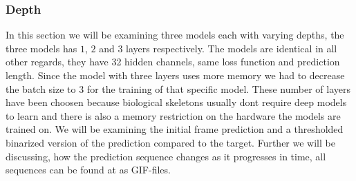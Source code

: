 \documentclass[a4paper,12pt]{article}
\begin{document}
\subsubsection{Depth}
In this section we will be examining three models each with varying depths, the three models has $1$, $2$ and $3$ layers respectively. The models are identical in all other regards, they have 32 hidden channels, same loss function and prediction length. Since the model with three layers uses more memory we had to decrease the batch size to $3$ for the training of that specific model. These number of layers have been choosen because biological skeletons usually dont require deep models to learn and there is also a memory restriction on the hardware the models are trained on. We will be examining the initial frame prediction and a thresholded binarized version of the prediction compared to the target. Further we will be discussing, how the prediction sequence changes as it progresses in time, all sequences can be found at \cite{gagarahn2025bachelor} as GIF-files.
\end{document}
